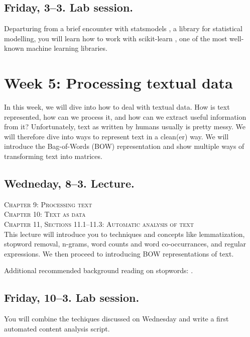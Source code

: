 \subsection*{Friday, 3--3. Lab session.}

Departuring from a brief encounter with statsmodels \citep{statsmodels}, a library for statistical modelling, you will learn how to work with scikit-learn \citep{scikit-learn}, one of the most well-known machine learning libraries.





\section*{Week 5: Processing textual data}
In this week, we will dive into how to deal with textual data. How is text represented, how can we process it, and how can we extract useful information from it?
Unfortunately, text as written by humans usually is pretty messy.  We will therefore dive  into ways to represent text in a clean(er) way. We will introduce the Bag-of-Words (BOW) representation and show multiple ways of transforming text into matrices.


\subsection*{Wedneday, 8--3. Lecture.}
\textsc{ Chapter 9: Processing text}\\
\textsc{ Chapter 10: Text as data}\\
\textsc{ Chapter 11, Sections 11.1--11.3: Automatic analysis of text}\\
  
This lecture will introduce you to techniques and concepts like lemmatization, stopword removal, n-grams, word counts and word co-occurrances, and regular expressions. We then proceed to introducing BOW representations of text.

Additional recommended background reading on stopwords: \cite{Nothman2018}.


\subsection*{Friday, 10--3. Lab session.}
You will combine the techiques discussed on Wednesday and write a first automated content analysis script.


